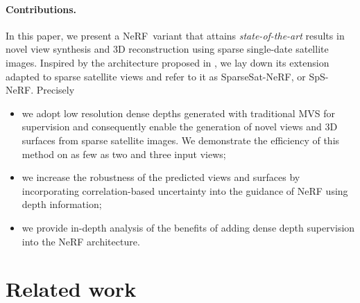 \documentclass{isprs} %
\newcommand{\Nerf}{{NeRF}}
\newcommand{\OurNeRF}{{SparseSat-NeRF}}
\newcommand{\OurNeRFShort}{{SpS-NeRF}}
\begin{document}
\paragraph{Contributions.}
In this paper, we present a \Nerf~variant that attains \textit{state-of-the-art} results in novel view synthesis and 3D reconstruction using sparse single-date satellite images. Inspired by the architecture proposed in \cite{mari2022sat}, we lay down its extension adapted to sparse satellite views and refer to it as \OurNeRF, or \OurNeRFShort. Precisely 
 \begin{itemize}
     \item we adopt low resolution dense depths generated with traditional MVS for supervision and consequently enable the generation of novel views and 3D surfaces from sparse satellite images. We demonstrate the efficiency of this method on as few as two and three input views;
     \item we increase the robustness of the predicted views and surfaces by incorporating correlation-based uncertainty into the guidance of NeRF using depth information;
     \item we provide in-depth analysis of the benefits of adding dense depth supervision into the NeRF architecture. 
 \end{itemize}


\section{Related work}
\end{document}
